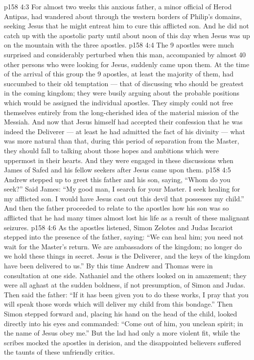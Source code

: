 \vs p158 4:3 For almost two weeks this anxious father, a minor official of Herod Antipas, had wandered about through the western borders of Philip’s domains, seeking Jesus that he might entreat him to cure this afflicted son. And he did not catch up with the apostolic party until about noon of this day when Jesus was up on the mountain with the three apostles.
\vs p158 4:4 The 9 apostles were much surprised and considerably perturbed when this man, accompanied by almost 40 other persons who were looking for Jesus, suddenly came upon them. At the time of the arrival of this group the 9 apostles, at least the majority of them, had succumbed to their old temptation --- that of discussing who should be greatest in the coming kingdom; they were busily arguing about the probable positions which would be assigned the individual apostles. They simply could not free themselves entirely from the long\hyp{}cherished idea of the material mission of the Messiah. And now that Jesus himself had accepted their confession that he was indeed the Deliverer --- at least he had admitted the fact of his divinity --- what was more natural than that, during this period of separation from the Master, they should fall to talking about those hopes and ambitions which were uppermost in their hearts. And they were engaged in these discussions when James of Safed and his fellow seekers after Jesus came upon them.
\vs p158 4:5 Andrew stepped up to greet this father and his son, saying, “Whom do you seek?” Said James: “My good man, I search for your Master. I seek healing for my afflicted son. I would have Jesus cast out this devil that possesses my child.” And then the father proceeded to relate to the apostles how his son was so afflicted that he had many times almost lost his life as a result of these malignant seizures.
\vs p158 4:6 As the apostles listened, Simon Zelotes and Judas Iscariot stepped into the presence of the father, saying: “We can heal him; you need not wait for the Master’s return. We are ambassadors of the kingdom; no longer do we hold these things in secret. Jesus is the Deliverer, and the keys of the kingdom have been delivered to us.” By this time Andrew and Thomas were in consultation at one side. Nathaniel and the others looked on in amazement; they were all aghast at the sudden boldness, if not presumption, of Simon and Judas. Then said the father: “If it has been given you to do these works, I pray that you will speak those words which will deliver my child from this bondage.” Then Simon stepped forward and, placing his hand on the head of the child, looked directly into his eyes and commanded: “Come out of him, you unclean spirit; in the name of Jesus obey me.” But the lad had only a more violent fit, while the scribes mocked the apostles in derision, and the disappointed believers suffered the taunts of these unfriendly critics.
